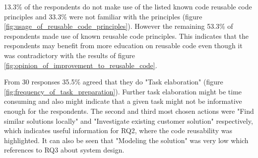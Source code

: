 13.3\% of the respondents do not make use of the listed known code reusable code principles and 33.3\% were not familiar with the principles (figure \ref{fig:usage_of_reusable_code_principles}). However the remaining 53.3\% of respondents made use of known reusable code principles. This indicates that the respondents may benefit from more education on reusable code even though it was contradictory with the results of figure \ref{fig:opinion_of_improvement_to_reusable_code}.


From 30 responses 35.5\% agreed that they do "Task elaboration" (figure \ref{fig:frequency_of_task_preparation}). Further task elaboration might be time consuming and also might indicate that a given task might not be informative enough for the respondents. The second and third most chosen actions were "Find similar solutions locally" and "Investigate existing customer solution" respectively, which indicates useful information for RQ2, where the code reusability was highlighted. It can also be seen that "Modeling the solution" was very low which references to RQ3 about system design.

